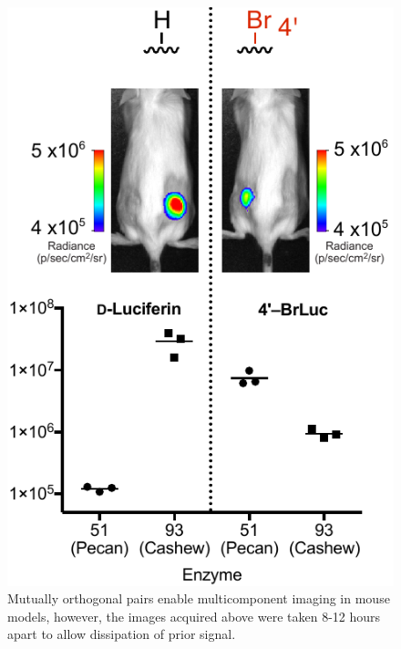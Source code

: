 \documentclass[11pt]{article}
\begin{document}
\begin{figure}
\begin{centering}
\includegraphics[width=\textwidth]{figures/mouse1pc.pdf}

\end{centering}
\footnotesize
\caption{\label{figure:mice}
Mutually orthogonal pairs enable multicomponent imaging in mouse models, however, the images acquired above were taken 8-12 hours apart to allow dissipation of prior signal.
}
\end{figure}
\end{document}

